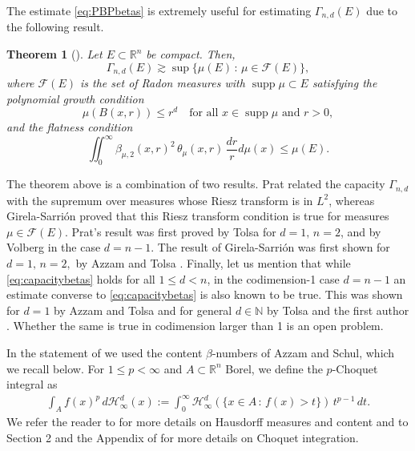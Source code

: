 \documentclass[11pt,reqno]{amsart}
\newcommand{\fr}[2]{\frac{#1}{#2}}
\newtheorem{theorem}{Theorem}[section]
\theoremstyle{definition}
\theoremstyle{remark}
\numberwithin{equation}{section}
\newcommand{\R}{\mathbb{R}}
\newcommand{\hdc}{\mathcal{H}^d_\infty}
\DeclareMathOperator{\supp}{supp}
\theoremstyle{theorem}
\theoremstyle{definition}
\theoremstyle{remark}
\numberwithin{equation}{section}
\begin{document}
	The estimate \eqref{eq:PBPbetas} is extremely useful for estimating $\Gamma_{n,d}(E)$ due to the following result.
	\begin{theorem}[\cite{prat2012semiadd,girela-sarrion2018}]\label{thm:capacitybetas}
		Let $E\subset\R^n$ be compact. Then,
		\begin{equation}\label{eq:capacitybetas}
		\Gamma_{n,d}(E)\gtrsim \sup \{\mu(E)\, :\, \mu\in\mathcal{F}(E)\},
		\end{equation}
		where $\mathcal{F}(E)$ is the set of Radon measures with $\supp\mu\subset E$ satisfying the polynomial growth condition
		\begin{equation*}
		\mu(B(x,r))\le r^d\quad \text{for all $x\in\supp\mu$ and $r>0$},
		\end{equation*}
		and the flatness condition
		\begin{equation*}
		\iint_0^{\infty} \beta_{\mu,2}(x,r)^2\,\theta_\mu(x,r)\, \fr{dr}{r}d\mu(x)\le \mu(E).
		\end{equation*}
	\end{theorem}
	The theorem above is a combination of two results. Prat \cite{prat2012semiadd} related the capacity $\Gamma_{n,d}$ with the supremum over measures whose Riesz transform is in $L^2$, whereas Girela-Sarrión \cite{girela-sarrion2018} proved that this Riesz transform condition is true for measures $\mu\in\mathcal{F}(E)$. Prat's result was first proved by Tolsa \cite{tolsa2003painleve} for $d=1,\, n=2$, and by Volberg \cite{volberg2003calderon} in the case $d=n-1$. The result of Girela-Sarrión was first shown for $d=1,\, n=2,$ by Azzam and Tolsa \cite{azzam2015characterization}. Finally, let us mention that while \eqref{eq:capacitybetas} holds for all $1\le d<n$, in the codimension-1 case $d=n-1$ an estimate converse to \eqref{eq:capacitybetas} is also known to be true. This was shown for $d=1$ by Azzam and Tolsa \cite{tolsa2005bilipschitz,azzam2015characterization} and for general $d\in\mathbb{N}$ by Tolsa and the first author \cite{dkabrowski2021measures,tolsa2021measures}. Whether the same is true in codimension larger than 1 is an open problem.

	In the statement of  we used the content $\beta$-numbers of Azzam and Schul, which we recall below. For $1 \leq p<\infty$ and $A \subset \R^n$ Borel, we define the $p$-Choquet integral as 
	\begin{align*}
	\int_A f(x)^p\, d \hdc(x) := \int_0^\infty \hdc(\{x \in A\, :\, f(x)>t\}) \, t^{p-1}\, dt.
	\end{align*}
	We refer the reader to \cite{mattila} for more details on Hausdorff measures and content and to Section 2 and the Appendix of \cite{azzam2018analyst} for more details on Choquet integration.  
	
\end{document}

